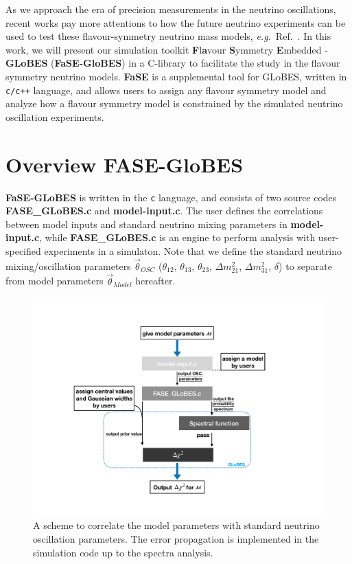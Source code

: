 \documentclass[aps,prd,nofootinbib,preprint]{revtex4}
\begin{document}
As we approach the era of precision measurements in the neutrino oscillations, recent works pay more attentions to how the future neutrino experiments can be used to test these flavour-symmetry neutrino mass models, \textit{e.g.}~Ref.~\cite{Ballett:2016yod,Chatterjee:2017xkb, Ding:2019zhn, Tang:2019edw, Blennow:2020snb}. In this work, we will present our simulation toolkit \textbf{F}l\textbf{a}vour \textbf{S}ymmetry \textbf{E}mbedded - \textbf{GLoBES} (\textbf{FaSE-GloBES}) in a C-library to facilitate the study in the flavour symmetry neutrino models. \textbf{FaSE} is a supplemental tool for GLoBES, written in \texttt{c/c++} language, and allows users to assign any flavour symmetry model and analyze how a flavour symmetry model is constrained by the simulated neutrino oscillation experiments.

\section{Overview FASE-GloBES}

\textbf{FaSE-GLoBES} is written in the \texttt{c} language, and consists of two source codes \textbf{FASE\_GLoBES.c} and \textbf{model-input.c}. The user defines the correlations between model inputs and standard neutrino mixing parameters in \textbf{model-input.c}, while \textbf{FASE\_GLoBES.c} is an engine to perform analysis with user-specified experiments in a simulaton. Note that we define the standard neutrino mixing/oscillation parameters $\vec{\theta}_{OSC}$ ($\theta_{12}$, $\theta_{13}$, $\theta_{23}$, $\Delta m_{21}^2$, $\Delta m_{31}^2$, $\delta$) to separate from model parameters $\vec{\theta}_{Model}$ hereafter.

\begin{figure}[!h]%
\centering
\includegraphics[width=7.5in]{Figs/FASE-chart_1_2.pdf}
\caption{A scheme to correlate the model parameters with standard neutrino oscillation parameters. The error propagation is implemented in the simulation code up to the spectra analysis.}%
\label{fig:FASE}
\end{figure}
\end{document}
